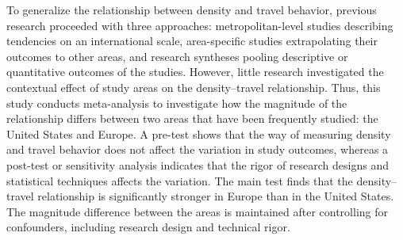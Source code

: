 To generalize the relationship between density and travel behavior, previous research proceeded with three approaches: metropolitan-level studies describing tendencies on an international scale, area-specific studies extrapolating their outcomes to other areas, and research syntheses pooling descriptive or quantitative outcomes of the studies. However, little research investigated the contextual effect of study areas on the density--travel relationship. Thus, this study conducts meta-analysis to investigate how the magnitude of the relationship differs between two areas that have been frequently studied: the United States and Europe. A pre-test shows that the way of measuring density and travel behavior does not affect the variation in study outcomes, whereas a post-test or sensitivity analysis indicates that the rigor of research designs and statistical techniques affects the variation. The main test finds that the density--travel relationship is significantly stronger in Europe than in the United States. The magnitude difference between the areas is maintained after controlling for confounders, including research design and technical rigor.